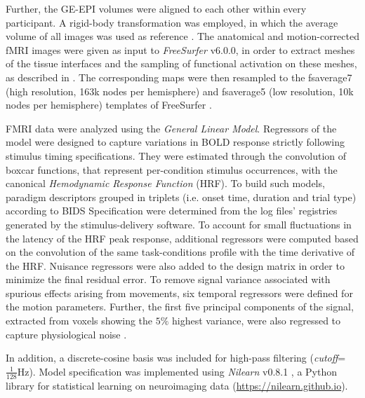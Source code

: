 Further, the GE-EPI volumes were aligned to each other within every participant.
%
A rigid-body transformation was employed, in which the average volume of all
images was used as reference \citep{Friston1995}.
%
The anatomical and motion-corrected fMRI images were given as input to
\emph{FreeSurfer} v6.0.0, in order to extract meshes of the tissue
interfaces and the sampling of functional activation on these meshes, as
described in \citep{vanessen2012}.
%
The corresponding maps were then resampled to the fsaverage7 (high resolution,
163k nodes per hemisphere) and fsaverage5 (low resolution, 10k nodes per hemisphere) templates of
FreeSurfer \citep{Fischl1999}.

FMRI data were analyzed using the \textit{General Linear Model}.
%
Regressors of the model were designed to capture variations in BOLD response
strictly following stimulus timing specifications.
%
They were estimated through the convolution of boxcar functions, that represent
per-condition stimulus occurrences, with the canonical \textit{Hemodynamic
  Response Function} (HRF).
%
To build such models, paradigm descriptors grouped in triplets (i.e. onset time,
duration and trial type) according to BIDS Specification were determined from
the log files' registries generated by the stimulus-delivery software.
%
To account for small fluctuations in the latency of the HRF peak response,
additional regressors were computed based on the convolution of the same
task-conditions profile with the time derivative of the HRF.
%
Nuisance regressors were also added to the design matrix in order to minimize
the final residual error.
%
To remove signal variance associated with spurious effects arising from
movements, six temporal regressors were defined for the motion parameters.
%
Further, the first five principal components of the signal, extracted from
voxels showing the $5\%$ highest variance, were also regressed to capture
physiological noise \citep{Behzadi2007}.

In addition, a discrete-cosine basis was included for high-pass filtering
(\textit{cutoff}=$\frac{1}{128}\textrm{Hz}$).
%
Model specification was implemented using \textit{Nilearn} v0.8.1
\citep{Abraham2014}, a Python library for statistical learning on neuroimaging
data (\url{https://nilearn.github.io}).